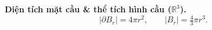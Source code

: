 \textbf{Diện tích mặt cầu \& thể tích hình cầu ($\mathbb{R}^3$).}
$$|\partial B_r| = 4\pi r^2,\qquad |B_r| = \tfrac{4}{3}\pi r^3.$$
